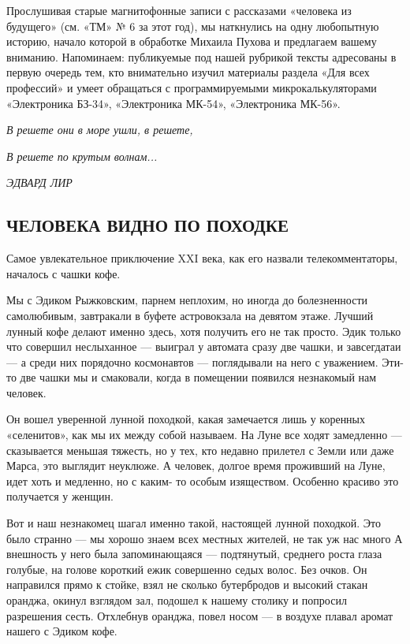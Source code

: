 \documentclass[11pt,a4paper,oneside]{article}
\begin{document}
Прослушивая старые магнитофонные записи с рассказами «человека из будущего» (см. «ТМ» № 6 за этот год), мы наткнулись на одну любопытную историю, начало которой в обработке Михаила Пухова и предлагаем вашему вниманию. Напоминаем: публикуемые под нашей рубрикой тексты адресованы в первую очередь тем, кто внимательно изучил материалы раздела «Для всех профессий» и умеет обращаться с программируемыми микрокалькуляторами «Электроника БЗ-34», «Электроника МК-54», «Электроника МК-56».

\textit{В решете они в море ушли, в решете,}

\textit{В решете по крутым волнам...}

\textit{ЭДВАРД ЛИР}

\subsection{ЧЕЛОВЕКА ВИДНО ПО ПОХОДКЕ}
\label{pohodka}

Самое увлекательное приключение XXI века, как его назвали телекомментаторы, началось с чашки кофе.

Мы с Эдиком Рыжковским, парнем неплохим, но иногда до болезненности самолюбивым, завтракали в буфете астровокзала на девятом этаже. Лучший лунный кофе делают именно здесь, хотя получить его не так просто. Эдик только что совершил неслыханное — выиграл у автомата сразу две чашки, и завсегдатаи — а среди них порядочно космонавтов — поглядывали на него с уважением. Эти-то две чашки мы и смаковали, когда в помещении появился незнакомый нам человек.

Он вошел уверенной лунной походкой, какая замечается лишь у коренных «селенитов», как мы их между собой называем. На Луне все ходят замедленно — сказывается меньшая тяжесть, но у тех, кто недавно прилетел с Земли или даже Марса, это выглядит неуклюже. А человек, долгое время проживший на Луне, идет хоть и медленно, но с каким- то особым изяществом. Особенно красиво это получается у женщин.

Вот и наш незнакомец шагал именно такой, настоящей лунной походкой. Это было странно — мы хорошо знаем всех местных жителей, не так уж нас много А внешность у него была запоминающаяся — подтянутый, среднего роста глаза голубые, на голове короткий ежик совершенно седых волос. Без очков. Он направился прямо к стойке, взял не сколько бутербродов и высокий стакан оранджа, окинул взглядом зал, подошел к нашему столику и попросил разрешения сесть. Отхлебнув оранджа, повел носом — в воздухе плавал аромат нашего с Эдиком кофе.
\end{document}
